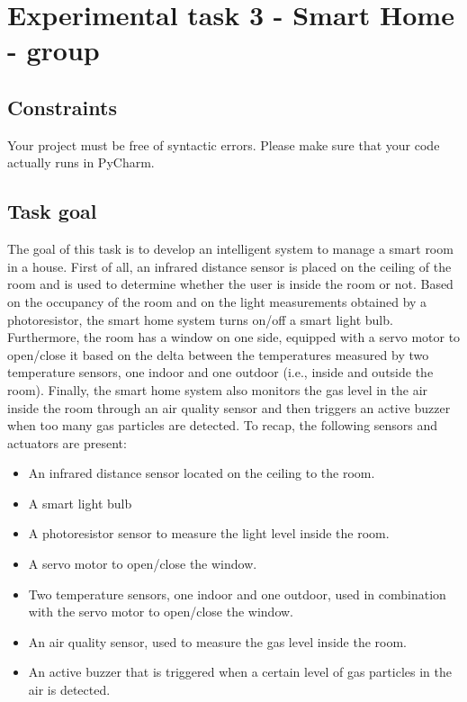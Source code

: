 \chapter{Experimental task 3 - Smart Home - \tdd group}
\section{Constraints}
Your project must be free of syntactic errors. Please make sure that your code actually runs in PyCharm.

\section{Task goal}
The goal of this task is to develop an intelligent system to manage a smart room in a house. First of all, an infrared distance sensor is placed on the ceiling of the room and is used to determine whether the user is inside the room or not.
Based on the occupancy of the room and on the light measurements obtained by a photoresistor, the smart home system turns on/off a smart light bulb. 
Furthermore, the room has a window on one side, equipped with a servo motor to open/close it based on the delta between the temperatures measured by two temperature sensors, one indoor and one outdoor (i.e., inside and outside the room).
Finally, the smart home system also monitors the gas level in the air inside the room through an air quality sensor and then triggers an active buzzer when too many gas particles are detected.
To recap, the following sensors and actuators are present:

\begin{itemize}
    \item An infrared distance sensor located on the ceiling to the room.
    \item A smart light bulb
    \item A photoresistor sensor to measure the light level inside the room.
    \item A servo motor to open/close the window.
    \item Two temperature sensors, one indoor and one outdoor, used in combination with the servo motor to open/close the window.
    \item An air quality sensor, used to measure the gas level inside the room.
    \item An active buzzer that is triggered when a certain level of gas particles in the air is detected.
\end{itemize}

